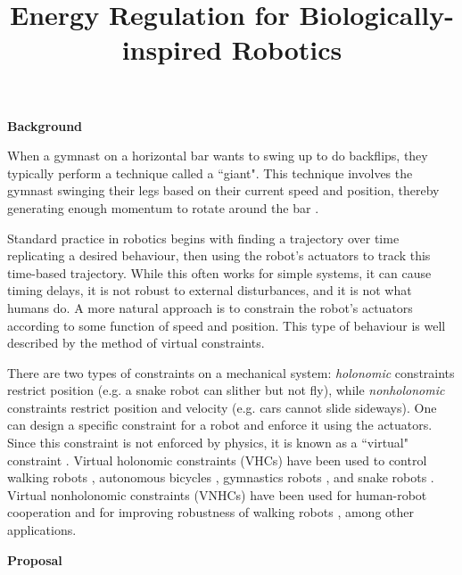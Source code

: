 \documentclass[a4paper,12pt]{article}
\begin{document}
\title{Energy Regulation for Biologically-inspired Robotics}
\author{}
\date{}
\maketitle

\vspace{-1cm}
\begin{large}
\textbf{Background}
\end{large}

When a gymnast on a horizontal bar wants to swing up to do backflips, they
typically perform a technique called a ``giant".
This technique involves the gymnast swinging their legs based on their current
speed and position, thereby generating enough momentum to rotate around the bar
\cite{pendulum_length_giant_gymnastics}.  

Standard practice in robotics begins with finding a trajectory over time
replicating a desired behaviour, then using the robot's actuators to track this
time-based trajectory. 
While this often works for simple systems, it can cause timing delays, it is not
robust to external disturbances, and it is not what humans do.
A more natural approach is to constrain the robot's actuators according to
some function of speed and position.
This type of behaviour is well described by the method of virtual constraints.

There are two types of constraints on a mechanical system:
\textit{holonomic} constraints restrict position (e.g. a snake robot can slither
but not fly),
while \textit{nonholonomic} constraints restrict position and
velocity (e.g. cars cannot slide sideways).
One can design a specific constraint for a robot and enforce it using the
actuators.
Since this constraint is not enforced by physics, it is known as a ``virtual"
constraint
\cite{vhcs_for_el_systems}.
Virtual holonomic constraints (VHCs) have been used to control walking robots
\cite{stable-walking}, autonomous bicycles \cite{bicycle},
gymnastics robots \cite{xingbo-thesis}, and snake robots \cite{snake-robot}.
Virtual nonholonomic constraints (VNHCs) have been used for human-robot
cooperation \cite{vnhc-human-robot-coop} and for improving robustness of walking
robots \cite{vnhc-biped-robot,hybrid_zero_dynamics_bipedal_nhvcs}, among other
applications.

\begin{large} \textbf{Proposal} \end{large}
\end{document}
